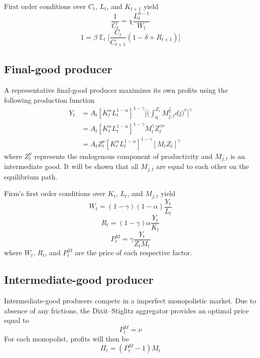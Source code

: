 \documentclass{article}
\DeclareMathOperator{\E}{\mathbb{E}}
\begin{document}
First order conditions over $C_t$, $L_t$, and $K_{t+1}$ yield
\begin{equation}
\frac{1}{C_t} = \chi \frac{L_t^{\theta - 1} }{W_t}
\end{equation}
\begin{equation}
1 = \beta \E_t \bigg[\frac{C_t}{C_{t+1}} (1 - \delta + R_{t+1})  \bigg]
\end{equation}

\subsection{Final-good producer}

A representative final-good producer maximizes its own profits using the following production function
\begin{equation}
\begin{aligned}
Y_t &= A_t[K_t^{\alpha}L_t^{1 - \alpha}]^{1 - \gamma} \bigg[ \bigg( \int_0^{Z_t} M_{j,t}^{\frac{1}{\nu}} dj \bigg)^{\nu} \bigg]^{\gamma} \\
    &= A_t[K_t^{\alpha}L_t^{1 - \alpha}]^{1 - \gamma} M_t^{\gamma} Z_t^{\gamma \nu} \\
    &= A_t Z_t^{\nu}[K_t^{\alpha}L_t^{1 - \alpha}]^{1 - \gamma} [M_t Z_t]^{\gamma}
\end{aligned}
\end{equation}
where $Z_t^{\nu}$ represents the endogenous component of productivity and $M_{j,t}$ is an intermediate good. It will be shown that all $M_{j,t}$ are equal to each other on the equilibrium path. 

Firm's first order conditions over $K_t$, $L_t$, and $M_{j,t}$ yield
\begin{equation}
W_t = (1 - \gamma)(1 - \alpha) \frac{Y_t}{L_t}
\end{equation}
\begin{equation}
R_t = (1 - \gamma)\alpha \frac{Y_t}{K_t}
\end{equation}
\begin{equation}
P^M_t = \gamma \frac{Y_t}{Z_t M_t}
\end{equation}
where $W_t$, $R_t$, and $P^M_t$ are the price of each respective factor.

\subsection{Intermediate-good producer}

Intermediate-good producers compete in a imperfect monopolistic market. Due to absence of any frictions, the Dixit–Stiglitz aggregator provides an optimal price equal to
\begin{equation}
P_t^M = \nu
\end{equation}
For each monopolist, profits will then be
\begin{equation}
\Pi_t = (P_t^M - 1)M_t
\end{equation}
\end{document}
